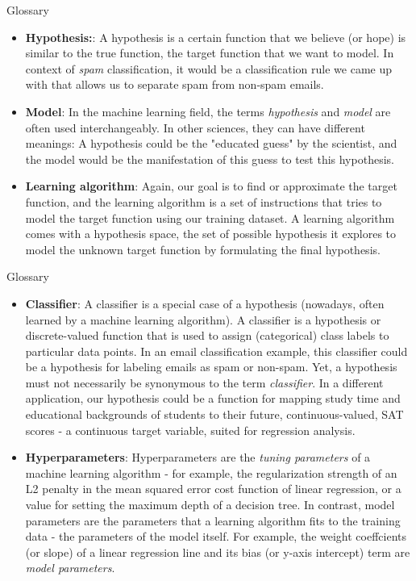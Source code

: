 \documentclass[compress,oilve]{beamer}
\begin{document}
\begin{frame}{Glossary}
\begin{itemize}
\item \textbf{Hypothesis:}: A hypothesis is a certain function that we believe (or hope) is similar to the true function, the target function that we want to model. In context of \textit{spam} classification, it would be a classification rule we came up with that allows us to separate spam from non-spam emails.

\item \textbf{Model}: In the machine learning field, the terms \textit{hypothesis} and \textit{model} are often used interchangeably. In other sciences, they can have different meanings: A hypothesis could be the "educated guess" by the scientist, and the model would be the manifestation of this guess to test this hypothesis.

\item \textbf{Learning algorithm}: Again, our goal is to find or approximate the target function, and the learning algorithm is a set of instructions that tries to model the target function using our training dataset. A learning algorithm comes with a hypothesis space, the set of possible hypothesis it explores to model the unknown target function by formulating the final hypothesis.

\end{itemize}
\end{frame}



\begin{frame}{Glossary}
\begin{itemize}

\item \textbf{Classifier}: A classifier is a special case of a hypothesis (nowadays, often learned by a machine learning algorithm). A classifier is a hypothesis or discrete-valued function that is used to assign (categorical) class labels to particular data points. In an email classification example, this classifier could be a hypothesis for labeling emails as spam or non-spam. Yet, a hypothesis must not necessarily be synonymous to the term \textit{classifier}. In a different application, our hypothesis could be a function for mapping study time and educational backgrounds of students to their future, continuous-valued, SAT scores - a continuous target variable, suited for regression analysis.
\item \textbf{Hyperparameters}: Hyperparameters are the \textit{tuning parameters} of a machine learning algorithm - for example, the regularization strength of an L2 penalty in the mean squared error cost function of linear regression, or a value for setting the maximum depth of a decision tree. In contrast, model parameters are the parameters that a learning algorithm fits to the training data - the parameters of the model itself. For example, the weight coeffcients (or slope) of a linear regression line and its bias (or y-axis intercept) term are \textit{model parameters}.
\end{itemize}
\end{frame}
\end{document}
